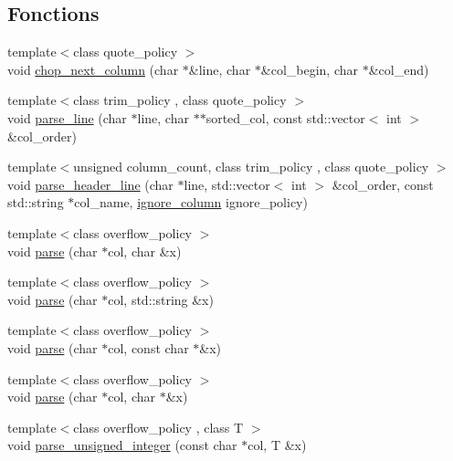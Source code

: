 \subsection*{Fonctions}
\begin{DoxyCompactItemize}
\item 
{\footnotesize template$<$class quote\+\_\+policy $>$ }\\void \hyperlink{namespaceio_1_1detail_a5656f385aea8d6ee5814a2abc20f5191}{chop\+\_\+next\+\_\+column} (char $\ast$\&line, char $\ast$\&col\+\_\+begin, char $\ast$\&col\+\_\+end)
\item 
{\footnotesize template$<$class trim\+\_\+policy , class quote\+\_\+policy $>$ }\\void \hyperlink{namespaceio_1_1detail_af7113f75d17577c3964d5d45fef65d43}{parse\+\_\+line} (char $\ast$line, char $\ast$$\ast$sorted\+\_\+col, const std\+::vector$<$ int $>$ \&col\+\_\+order)
\item 
{\footnotesize template$<$unsigned column\+\_\+count, class trim\+\_\+policy , class quote\+\_\+policy $>$ }\\void \hyperlink{namespaceio_1_1detail_a29aee32eb931073ca832933c7ed7cf51}{parse\+\_\+header\+\_\+line} (char $\ast$line, std\+::vector$<$ int $>$ \&col\+\_\+order, const std\+::string $\ast$col\+\_\+name, \hyperlink{namespaceio_a544bc96f3a6bf086cb82e599be1a8ebc}{ignore\+\_\+column} ignore\+\_\+policy)
\item 
{\footnotesize template$<$class overflow\+\_\+policy $>$ }\\void \hyperlink{namespaceio_1_1detail_a2109437c5cfde706232ff352a06a8c9f}{parse} (char $\ast$col, char \&x)
\item 
{\footnotesize template$<$class overflow\+\_\+policy $>$ }\\void \hyperlink{namespaceio_1_1detail_a0a834d872803de946c45bb9993ff1cdb}{parse} (char $\ast$col, std\+::string \&x)
\item 
{\footnotesize template$<$class overflow\+\_\+policy $>$ }\\void \hyperlink{namespaceio_1_1detail_a4b18842fa823d4e5ff2856c106a935f8}{parse} (char $\ast$col, const char $\ast$\&x)
\item 
{\footnotesize template$<$class overflow\+\_\+policy $>$ }\\void \hyperlink{namespaceio_1_1detail_a51894246476f8614a57292c4ecd5ee70}{parse} (char $\ast$col, char $\ast$\&x)
\item 
{\footnotesize template$<$class overflow\+\_\+policy , class T $>$ }\\void \hyperlink{namespaceio_1_1detail_a7e3c24544bc8a152ad2fdcad068cc15d}{parse\+\_\+unsigned\+\_\+integer} (const char $\ast$col, T \&x)
$$
\end{DoxyCompactItemize}
